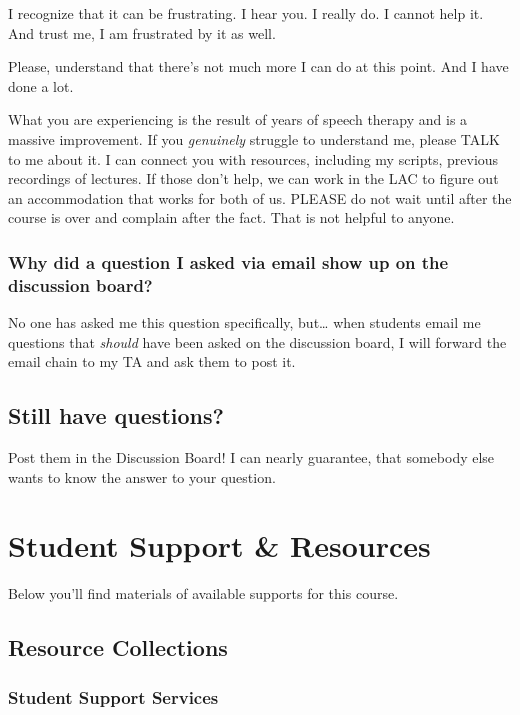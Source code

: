 \documentclass[
]{book}
\begin{document}
I recognize that it can be frustrating. I hear you. I really do. I cannot help it. And trust me, I am frustrated by it as well.

Please, understand that there's not much more I can do at this point. And I have done a lot.

What you are experiencing is the result of years of speech therapy and is a massive improvement. If you \emph{genuinely} struggle to understand me, please TALK to me about it. I can connect you with resources, including my scripts, previous recordings of lectures. If those don't help, we can work in the LAC to figure out an accommodation that works for both of us. PLEASE do not wait until after the course is over and complain after the fact. That is not helpful to anyone.

\subsection{Why did a question I asked via email show up on the discussion board?}\label{why-did-a-question-i-asked-via-email-show-up-on-the-discussion-board-1}

No one has asked me this question specifically, but\ldots{} when students email me questions that \emph{should} have been asked on the discussion board, I will forward the email chain to my TA and ask them to post it.

\section{Still have questions?}\label{still-have-questions}

Post them in the Discussion Board! I can nearly guarantee, that somebody else wants to know the answer to your question.

\chapter{Student Support \& Resources}\label{student-support-resources}

Below you'll find materials of available supports for this course.

\section{Resource Collections}\label{resource-collections}

\subsection{Student Support Services}\label{student-support-services}
\end{document}
